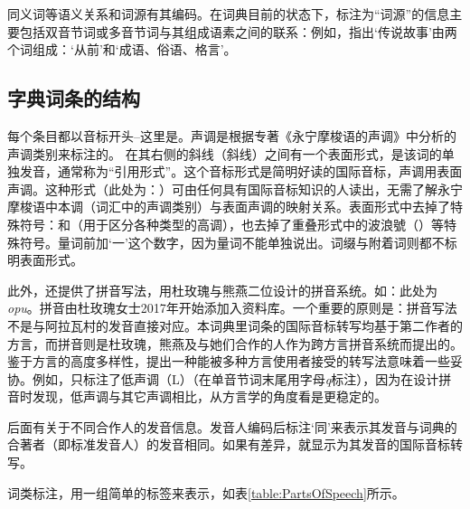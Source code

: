同义词等语义关系和词源有其编码。在词典目前的状态下，标注为“词源”的信息主要包括双音节词或多音节词与其组成语素之间的联系：例如，指出‘传说故事’由两个词组成：‘从前’和‘成语、俗语、格言’。

\subsection{字典词条的结构}
\label{sec:structure_of_entries}

每个条目都以音标开头--这里是。声调是根据专著《永宁摩梭语的声调》中分析的声调类别来标注的\parencite[80-90]{michaud2017}。
在其右侧的斜线（斜线）之间有一个表面形式，是该词的单独发音，通常称为“引用形式”。这个音标形式是简明好读的国际音标，声调用表面声调。这种形式（此处为：）可由任何具有国际音标知识的人读出，无需了解永宁摩梭语中本调（词汇中的声调类别）与表面声调的映射关系。表面形式中去掉了特殊符号：\phonologie{\$}和\phonologie{\#}（用于区分各种类型的高调），也去掉了重叠形式中的波浪號（\phonologie{\hspace{0.5em}\raisebox{-0.6ex}{\~}}）等特殊符号。量词前加‘一’这个数字，因为量词不能单独说出。词缀与附着词则都不标明表面形式。

此外，还提供了拼音写法，用杜玫瑰与熊燕二位设计的拼音系统\parencite{dobbs_ortho_2018}。如：此处为\emph{opu}。拼音由杜玫瑰女士2017年开始添加入资料库。一个重要的原则是：拼音写法不是与阿拉瓦村的发音直接对应。本词典里词条的国际音标转写均基于第二作者的方言，而拼音则是杜玫瑰，熊燕及与她们合作的人作为跨方言拼音系统而提出的。鉴于方言的高度多样性，提出一种能被多种方言使用者接受的转写法意味着一些妥协。例如，只标注了低声调（L）（在单音节词末尾用字母\emph{q}标注），因为在设计拼音时发现，低声调与其它声调相比，从方言学的角度看是更稳定的。

后面有关于不同合作人的发音信息。发音人编码后标注‘同’来表示其发音与词典的合著者（即标准发音人）的发音相同。如果有差异，就显示为其发音的国际音标转写。

词类标注，用一组简单的标签来表示，如表\ref{table:PartsOfSpeech}所示。

